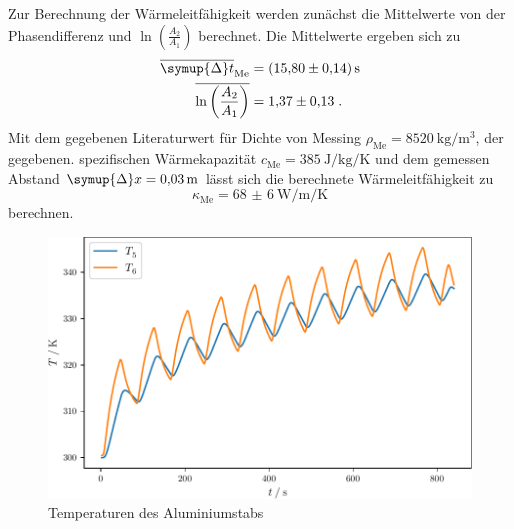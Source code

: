 Zur Berechnung der Wärmeleitfähigkeit werden zunächst die Mittelwerte von der Phasendifferenz und  $\ln \left (  \frac{A_2}{A_1} \right)$ berechnet.
Die Mittelwerte ergeben sich zu
\begin{align}
  \overline{\symup{\Delta} t}_\text{Me}                     &= \SI{15.80(14)}{\second} \\
  \overline{\ln \left (  \frac{A_2}{A_1} \right)} & = \num{1.37(13)} \; \text{.}        
\end{align}
Mit dem gegebenen Literaturwert für Dichte von Messing $\rho_\text{Me} = \SI{8520}{\kilogram\per\meter\cubed}$, der gegebenen. spezifischen Wärmekapazität 
$c_\text{Me} = \SI{385}{\joule\per\kilogram\per\kelvin}$ und dem gemessen Abstand $\symup{\Delta} x = \SI{0.03}{\meter}$ lässt sich die berechnete Wärmeleitfähigkeit zu
\begin{equation}
\kappa_\text{Me} = \SI{68(6)}{\watt\per\metre\per\kelvin}
\end{equation}
berechnen.
\begin{figure}
  \caption{Temperaturen des Aluminiumstabs}
  \centering
  \includegraphics[width = \textwidth]{build/Al.pdf}
\end{figure}
